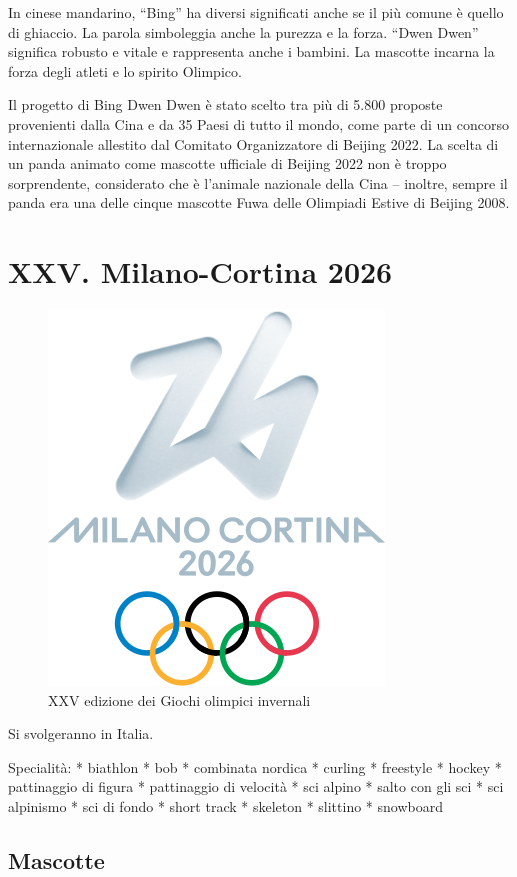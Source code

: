 \documentclass[
]{book}
\begin{document}
In cinese mandarino, ``Bing'' ha diversi significati anche se il più comune è quello di ghiaccio. La parola simboleggia anche la purezza e la forza.
``Dwen Dwen'' significa robusto e vitale e rappresenta anche i bambini.
La mascotte incarna la forza degli atleti e lo spirito Olimpico.

Il progetto di Bing Dwen Dwen è stato scelto tra più di 5.800 proposte provenienti dalla Cina e da 35 Paesi di tutto il mondo, come parte di un concorso internazionale allestito dal Comitato Organizzatore di Beijing 2022.
La scelta di un panda animato come mascotte ufficiale di Beijing 2022 non è troppo sorprendente, considerato che è l'animale nazionale della Cina -- inoltre, sempre il panda era una delle cinque mascotte Fuwa delle Olimpiadi Estive di Beijing 2008.

\chapter*{XXV. Milano-Cortina 2026}\label{xxv.-milano-cortina-2026}

\begin{figure}
\includegraphics[width=0.4\linewidth]{images/loghi/2026} \caption{XXV edizione dei Giochi olimpici invernali}\label{fig:unnamed-chunk-94}
\end{figure}

Si svolgeranno in Italia.

Specialità:
* biathlon
* bob
* combinata nordica
* curling
* freestyle
* hockey
* pattinaggio di figura
* pattinaggio di velocità
* sci alpino
* salto con gli sci
* sci alpinismo
* sci di fondo
* short track
* skeleton
* slittino
* snowboard

\section*{Mascotte}\label{mascotte-14}
\end{document}
